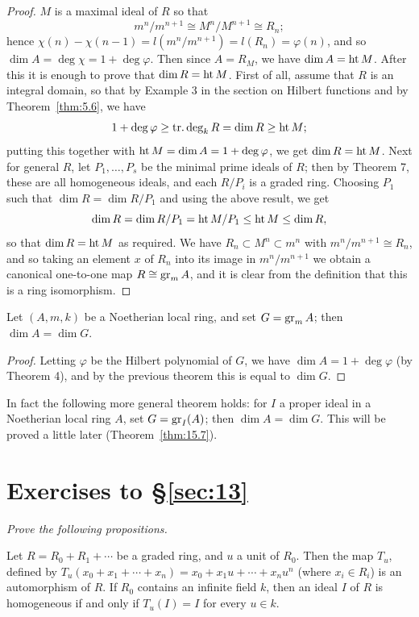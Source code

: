 \begin{proof}
$M$ is a maximal ideal of $R$ so that
\[
  m^n/m^{n+1} \cong M^n/M^{n+1} \cong R_n;
\]
hence $\chi(n) - \chi(n - 1) = l(m^n/m^{n+1}) = l(R_n) = \varphi(n)$, and so $\dim A = \deg \chi = 1 +
\deg \varphi$. Then since $A = R_M$, we have $\dim A = \operatorname{ht} M$. After this it is enough
to prove that $\dim R = \operatorname{ht} M$. First of all, assume that $R$ is an integral
domain, so that by Example 3 in the section on Hilbert functions and by
Theorem~\ref{thm:5.6}, we have
\[
  1 + \deg \varphi \ge \operatorname{tr.deg}_k R = \dim R \ge \operatorname{ht} M;
\]
putting this together with $\operatorname{ht} M = \dim A = 1 + \deg \varphi$, we get $\dim R = \operatorname{ht} M$.
Next for general $R$, let $P_1, \ldots, P_s$ be the minimal prime ideals of $R$; then by
Theorem 7, these are all homogeneous ideals, and each $R/P_i$ is a graded
ring. Choosing $P_1$ such that $\dim R = \dim R/P_1$ and using the above result,
we get
\[
  \dim R = \dim R/P_1 = \operatorname{ht} M/P_1 \le \operatorname{ht} M \le \dim R,
\]
so that $\dim R = \operatorname{ht} M$ as required. We have $R_n \subset M^n \subset m^n$ with $m^n/m^{n+1} \cong
R_n$, and so taking an element $x$ of $R_n$ into its image in $m^n/m^{n+1}$ we obtain
a canonical one-to-one map $R \cong \operatorname{gr}_m A$, and it is clear from the definition
that this is a ring isomorphism.
\end{proof}

\begin{theorem}\label{thm:13.9}
Let $(A, m, k)$ be a Noetherian local ring, and set $G = \operatorname{gr}_m A$;
then $\dim A = \dim G$.
\end{theorem}

\begin{proof}
Letting $\varphi$ be the Hilbert polynomial of $G$, we have $\dim A =
1 + \deg \varphi$ (by Theorem 4), and by the previous theorem this is equal to
$\dim G$.
\end{proof}

In fact the following more general theorem holds: for $I$ a proper ideal in a
Noetherian local ring $A$, set $G = \operatorname{gr}_I(A)$; then $\dim A = \dim G$. This will be
proved a little later (Theorem~\ref{thm:15.7}).

\section*{Exercises to \S\ref{sec:13}}
\emph{Prove the following propositions.}

\begin{exercise}\label{ex:13.1-ex}
Let $R = R_0 + R_1 + \cdots$ be a graded ring, and $u$ a unit of $R_0$. Then the map $T_u$,
defined by $T_u(x_0 + x_1 + \cdots + x_n) = x_0 + x_1u + \cdots + x_nu^n$ (where $x_i \in R_i$) is
an automorphism of $R$. If $R_0$ contains an infinite field $k$, then an ideal $I$ of $R$
is homogeneous if and only if $T_u(I) = I$ for every $u \in k$.
\end{exercise}

